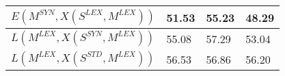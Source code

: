 \begin{table}[]
\begin{tabular}{@{\makebox[1.25em][l]{\rownumber\space}}llll@{}}
\gdef\rownumber{\circlednumber{\stepcounter{magicrownumbers}\arabic{magicrownumbers}}}%
$E(M^{SYN}, X(S^{LEX}, M^{LEX}))$      & 51.53	&	55.23	&	48.29          \\ 

\midrule
%

$L(M^{LEX}, X(S^{SYN}, M^{LEX}))$      & 55.08           & 57.29          & 53.04           \\ 
$L(M^{LEX}, X(S^{STD}, M^{LEX}))$      & 56.53           & 56.86           & 56.20           \\  
\midrule



\end{tabular}
\end{table}
